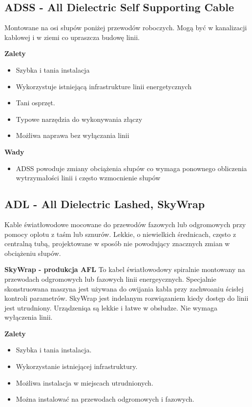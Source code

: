 \documentclass{article}
\begin{document}
\subsection{ADSS - All Dielectric Self Supporting Cable}
Montowane na osi słupów poniżej przewodów roboczych. Mogą być w kanalizacji kablowej i w ziemi co upraszcza budowę linii.

\textbf{Zalety}
\begin{itemize}
    \item Szybka i tania instalacja
    \item Wykorzystuje istniejącą infrastrukture linii energetycznych
    \item Tani osprzęt.
    \item Typowe narzędzia do wykonywania złączy
    \item Możliwa naprawa bez wyłączania linii
\end{itemize}

\textbf{Wady}
\begin{itemize}
    \item ADSS powoduje zmiany obciążenia słupów co wymaga ponownego obliczenia wytrzymałości linii i często wzmocnienie słupów
\end{itemize}

\subsection{ADL - All Dielectric Lashed, SkyWrap}
Kable światłowodowe mocowane do przewodów fazowych lub odgromowych przy pomocy oplotu z taśm lub sznurów. Lekkie, o niewielkich średnicach, często z centralną tubą, projektowane w sposób nie powodujący znacznych zmian w obciążeniu słupów.

\textbf{SkyWrap - produkcja AFL}
To kabel światłowodowy spiralnie montowany na przewodach odgromowych lub fazowych linii energeycznych. Specjalnie skonstruowana maszyna jest używana do owijania kabla przy zachwoaniu ścisłej kontroli parametrów. SkyWrap jest indelanym rozwiązaniem kiedy dostęp do linii jest utrudniony. Urządzeniqa są lekkie i łatwe w obsłudze. Nie wymaga wyłączenia linii.

\textbf{Zalety}
\begin{itemize}
    \item Szybka i tania instalacja.
    \item Wykorzystanie istniejącej infrastruktury.
    \item Możliwa instalacja w miejscach utrudnionych.
    \item Można instalować na przewodach odgromowych i fazowych.
\end{itemize}
\end{document}
